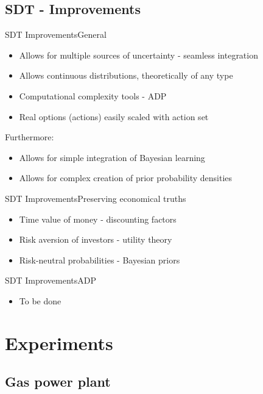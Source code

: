 \documentclass[us]{beamer}
\begin{document}
\subsection{SDT - Improvements}

\begin{frame}{SDT Improvements}{General}
	\begin{itemize}
		\item {Allows for multiple sources of uncertainty - seamless integration}
		\item {Allows continuous distributions, theoretically of any type}
		\item {Computational complexity tools - ADP}
		\item {Real options (actions) easily scaled with action set}
	\end{itemize}

	Furthermore: 
	\begin{itemize}
		\item{Allows for simple integration of Bayesian learning}
		\item{Allows for complex creation of prior probability densities}
	\end{itemize}
\end{frame}

\begin{frame}{SDT Improvements}{Preserving economical truths}
	\begin{itemize}
		\item {Time value of money - discounting factors}
		\item {Risk aversion of investors - utility theory }
		\item {Risk-neutral probabilities - Bayesian priors}
	\end{itemize}
\end{frame}


\begin{frame}{SDT Improvements}{ADP}
		\begin{itemize}
			\item{To be done}
		\end{itemize}
\end{frame}

\section{Experiments}

\subsection{Gas power plant}
	
\end{document}

